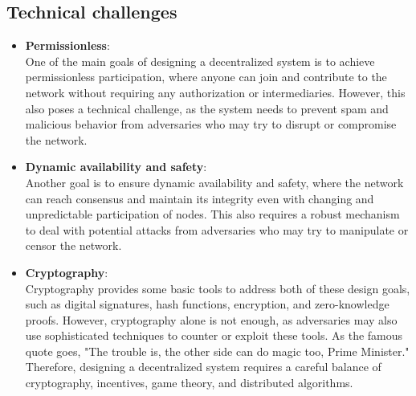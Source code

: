 \documentclass{report}
\begin{document}
\subsection*{Technical challenges}
\begin{itemize}
	\item \textbf{Permissionless}:\\
	One of the main goals of designing a decentralized system is to achieve permissionless participation, where anyone can join and contribute to the network without requiring any authorization or intermediaries. However, this also poses a technical challenge, as the system needs to prevent spam and malicious behavior from adversaries who may try to disrupt or compromise the network.
	\item \textbf{Dynamic availability and safety}:\\
	Another goal is to ensure dynamic availability and safety, where the network can reach consensus and maintain its integrity even with changing and unpredictable participation of nodes. This also requires a robust mechanism to deal with potential attacks from adversaries who may try to manipulate or censor the network.
	\item \textbf{Cryptography}:\\
	Cryptography provides some basic tools to address both of these design goals, such as digital signatures, hash functions, encryption, and zero-knowledge proofs. However, cryptography alone is not enough, as adversaries may also use sophisticated techniques to counter or exploit these tools. As the famous quote goes, "The trouble is, the other side can do magic too, Prime Minister." Therefore, designing a decentralized system requires a careful balance of cryptography, incentives, game theory, and distributed algorithms.
\end{itemize}
\end{document}
